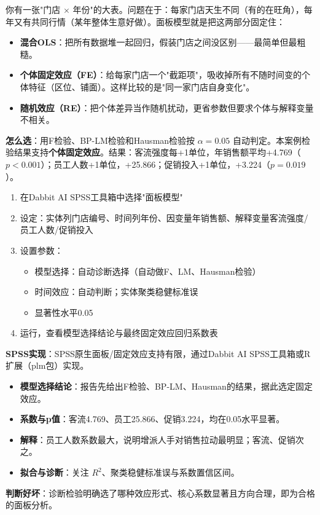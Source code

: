 \begin{algoprinciple}
你有一张"门店 $\times$ 年份"的大表。问题在于：每家门店天生不同（有的在旺角），每年又有共同行情（某年整体生意好做）。面板模型就是把这两部分固定住：

\begin{itemize}
    \item \textbf{混合OLS}：把所有数据堆一起回归，假装门店之间没区别——最简单但最粗糙。
    \item \textbf{个体固定效应（FE）}：给每家门店一个"截距项"，吸收掉所有不随时间变的个体特征（区位、铺面）。这样比较的是"同一家门店自身变化"。
    \item \textbf{随机效应（RE）}：把个体差异当作随机扰动，更省参数但要求个体与解释变量不相关。
\end{itemize}

\textbf{怎么选}：用F检验、BP-LM检验和Hausman检验按 $\alpha=0.05$ 自动判定。本案例检验结果支持\textbf{个体固定效应}。结果：客流强度每+1单位，年销售额平均+4.769（$p<0.001$）；员工人数+1单位，+25.866；促销投入+1单位，+3.224（$p=0.019$）。
\end{algoprinciple}

\begin{algosposs}
\begin{enumerate}
    \item 在Dabbit AI SPSS工具箱中选择"面板模型"
    \item 设定：实体列门店编号、时间列年份、因变量年销售额、解释变量客流强度/员工人数/促销投入
    \item 设置参数：
    \begin{itemize}
        \item 模型选择：自动诊断选择（自动做F、LM、Hausman检验）
        \item 时间效应：自动判断；实体聚类稳健标准误
        \item 显著性水平0.05
    \end{itemize}
    \item 运行，查看模型选择结论与最终固定效应回归系数表
\end{enumerate}

\textbf{SPSS实现}：SPSS原生面板/固定效应支持有限，通过Dabbit AI SPSS工具箱或R扩展（plm包）实现。
\end{algosposs}

\begin{algoresult}
\begin{itemize}
    \item \textbf{模型选择结论}：报告先给出F检验、BP-LM、Hausman的结果，据此选定固定效应。
    \item \textbf{系数与p值}：客流4.769、员工25.866、促销3.224，均在0.05水平显著。
    \item \textbf{解释}：员工人数系数最大，说明增派人手对销售拉动最明显；客流、促销次之。
    \item \textbf{拟合与诊断}：关注 $R^2$、聚类稳健标准误与系数置信区间。
\end{itemize}

\textbf{判断好坏}：诊断检验明确选了哪种效应形式、核心系数显著且方向合理，即为合格的面板分析。
\end{algoresult}

